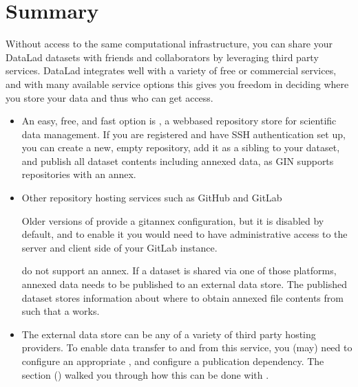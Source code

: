 \sphinxstepscope


\section{Summary}
\label{\detokenize{basics/101-140-summary:summary}}\label{\detokenize{basics/101-140-summary:summaryshare}}\label{\detokenize{basics/101-140-summary::doc}}
\sphinxAtStartPar
Without access to the same computational infrastructure, you can share your
DataLad datasets with friends and collaborators by leveraging third party
services. DataLad integrates well with a variety of free or commercial services,
and with many available service options this gives you freedom in deciding where
you store your data and thus who can get access.
\begin{itemize}
\item {} 
\sphinxAtStartPar
An easy, free, and fast option is {\hyperref[\detokenize{glossary:term-GIN}]{}}, a
web\sphinxhyphen{}based repository store for scientific data management. If you are registered
and have SSH authentication set up, you can create a new, empty repository,
add it as a sibling to your dataset, and publish all dataset contents \textendash{} including
annexed data, as GIN supports repositories with an annex.

\item {} 
\sphinxAtStartPar
Other repository hosting services such as GitHub and GitLab%
\begin{footnote}\sphinxAtStartFootnote
Older versions of {\hyperref[\detokenize{glossary:term-GitLab}]{}} provide a git\sphinxhyphen{}annex configuration, but it is disabled
by default, and to enable it you would need to have administrative
access to the server and client side of your GitLab instance.
%
\end{footnote} do not support
an annex. If a dataset is shared via one of those platforms, annexed data needs
to be published to an external data store. The published dataset stores
information about where to obtain annexed file contents from such that a
 works.

\item {} 
\sphinxAtStartPar
The external data store can be any of a variety of third party hosting providers.
To enable data transfer to and from this service, you (may) need to configure an
appropriate {\hyperref[\detokenize{glossary:term-special-remote}]{}}, and configure a publication dependency. The
section {\hyperref[\detokenize{basics/101-138-sharethirdparty:sharethirdparty}]{}} () walked you through how this can be done with
.


\end{itemize}
